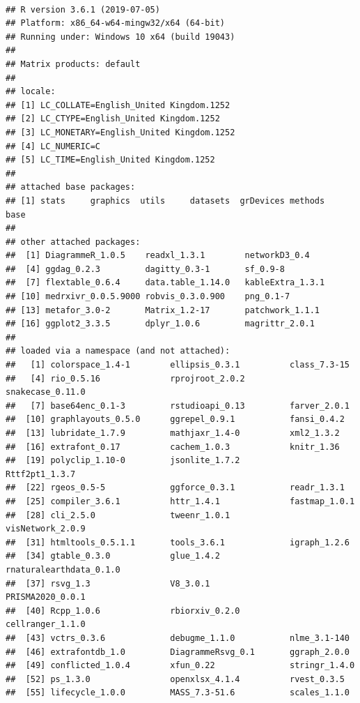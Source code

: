\documentclass[a4paper, twoside]{templates/ociamthesis}
\begin{document}
~

\begin{verbatim}
## R version 3.6.1 (2019-07-05)
## Platform: x86_64-w64-mingw32/x64 (64-bit)
## Running under: Windows 10 x64 (build 19043)
## 
## Matrix products: default
## 
## locale:
## [1] LC_COLLATE=English_United Kingdom.1252 
## [2] LC_CTYPE=English_United Kingdom.1252   
## [3] LC_MONETARY=English_United Kingdom.1252
## [4] LC_NUMERIC=C                           
## [5] LC_TIME=English_United Kingdom.1252    
## 
## attached base packages:
## [1] stats     graphics  utils     datasets  grDevices methods   base     
## 
## other attached packages:
##  [1] DiagrammeR_1.0.5    readxl_1.3.1        networkD3_0.4      
##  [4] ggdag_0.2.3         dagitty_0.3-1       sf_0.9-8           
##  [7] flextable_0.6.4     data.table_1.14.0   kableExtra_1.3.1   
## [10] medrxivr_0.0.5.9000 robvis_0.3.0.900    png_0.1-7          
## [13] metafor_3.0-2       Matrix_1.2-17       patchwork_1.1.1    
## [16] ggplot2_3.3.5       dplyr_1.0.6         magrittr_2.0.1     
## 
## loaded via a namespace (and not attached):
##   [1] colorspace_1.4-1        ellipsis_0.3.1          class_7.3-15           
##   [4] rio_0.5.16              rprojroot_2.0.2         snakecase_0.11.0       
##   [7] base64enc_0.1-3         rstudioapi_0.13         farver_2.0.1           
##  [10] graphlayouts_0.5.0      ggrepel_0.9.1           fansi_0.4.2            
##  [13] lubridate_1.7.9         mathjaxr_1.4-0          xml2_1.3.2             
##  [16] extrafont_0.17          cachem_1.0.3            knitr_1.36             
##  [19] polyclip_1.10-0         jsonlite_1.7.2          Rttf2pt1_1.3.7         
##  [22] rgeos_0.5-5             ggforce_0.3.1           readr_1.3.1            
##  [25] compiler_3.6.1          httr_1.4.1              fastmap_1.0.1          
##  [28] cli_2.5.0               tweenr_1.0.1            visNetwork_2.0.9       
##  [31] htmltools_0.5.1.1       tools_3.6.1             igraph_1.2.6           
##  [34] gtable_0.3.0            glue_1.4.2              rnaturalearthdata_0.1.0
##  [37] rsvg_1.3                V8_3.0.1                PRISMA2020_0.0.1       
##  [40] Rcpp_1.0.6              rbiorxiv_0.2.0          cellranger_1.1.0       
##  [43] vctrs_0.3.6             debugme_1.1.0           nlme_3.1-140           
##  [46] extrafontdb_1.0         DiagrammeRsvg_0.1       ggraph_2.0.0           
##  [49] conflicted_1.0.4        xfun_0.22               stringr_1.4.0          
##  [52] ps_1.3.0                openxlsx_4.1.4          rvest_0.3.5            
##  [55] lifecycle_1.0.0         MASS_7.3-51.6           scales_1.1.0           

\end{verbatim}
\end{document}
